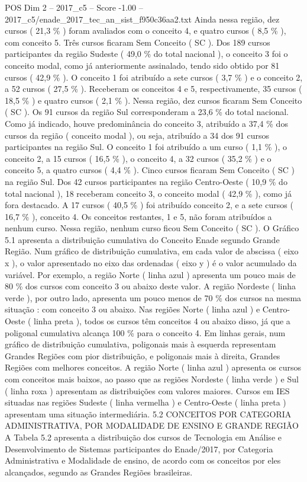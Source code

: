 \begin{textsample}{POS Dim 2 – 2017\_c5 – Score -1.00 – 2017\_c5/enade\_2017\_tec\_an\_sist\_f950c36aa2.txt}
Ainda nessa região, dez cursos ( 21,3 \% ) foram avaliados com o conceito 4, e quatro cursos ( 8,5 \% ), com conceito 5.
Três cursos ficaram Sem Conceito ( SC ).
Dos 189 cursos participantes da região Sudeste ( 49,0 \% do total nacional ), o conceito 3 foi o conceito modal, como já anteriormente assinalado, tendo sido obtido por 81 cursos ( 42,9 \% ).
O conceito 1 foi atribuído a sete cursos ( 3,7 \% ) e o conceito 2, a 52 cursos ( 27,5 \% ).
Receberam os conceitos 4 e 5, respectivamente, 35 cursos ( 18,5 \% ) e quatro cursos ( 2,1 \% ).
Nessa região, dez cursos ficaram Sem Conceito ( SC ).
Os 91 cursos da região Sul corresponderam a 23,6 \% do total nacional.
Como já indicado, houve predominância do conceito 3, atribuído a 37,4 \% dos cursos da região ( conceito modal ), ou seja, atribuído a 34 dos 91 cursos participantes na região Sul.
O conceito 1 foi atribuído a um curso ( 1,1 \% ), o conceito 2, a 15 cursos ( 16,5 \% ), o conceito 4, a 32 cursos ( 35,2 \% ) e o conceito 5, a quatro cursos ( 4,4 \% ).
Cinco cursos ficaram Sem Conceito ( SC ) na região Sul.
Dos 42 cursos participantes na região Centro-Oeste ( 10,9 \% do total nacional ), 18 receberam conceito 3, o conceito modal ( 42,9 \% ), como já fora destacado.
A 17 cursos ( 40,5 \% ) foi atribuído conceito 2, e a sete cursos ( 16,7 \% ), conceito 4.
Os conceitos restantes, 1 e 5, não foram atribuídos a nenhum curso.
Nessa região, nenhum curso ficou Sem Conceito ( SC ).
O Gráfico 5.1 apresenta a distribuição cumulativa do Conceito Enade segundo Grande Região.
Num gráfico de distribuição cumulativa, em cada valor de abscissa ( eixo x ), o valor apresentado no eixo das ordenadas ( eixo y ) é o valor acumulado da variável.
Por exemplo, a região Norte ( linha azul ) apresenta um pouco mais de 80 \% dos cursos com conceito 3 ou abaixo deste valor.
A região Nordeste ( linha verde ), por outro lado, apresenta um pouco menos de 70 \% dos cursos na mesma situação : com conceito 3 ou abaixo.
Nas regiões Norte ( linha azul ) e Centro-Oeste ( linha preta ), todos os cursos têm conceitos 4 ou abaixo disso, já que a poligonal cumulativa alcança 100 \% para o conceito 4.
Em linhas gerais, num gráfico de distribuição cumulativa, poligonais mais à esquerda representam Grandes Regiões com pior distribuição, e poligonais mais à direita, Grandes Regiões com melhores conceitos.
A região Norte ( linha azul ) apresenta os cursos com conceitos mais baixos, ao passo que as regiões Nordeste ( linha verde ) e Sul ( linha roxa ) apresentam as distribuições com valores maiores.
Cursos em IES situadas nas regiões Sudeste ( linha vermelha ) e Centro-Oeste ( linha preta ) apresentam uma situação intermediária. 5.2 CONCEITOS POR CATEGORIA ADMINISTRATIVA, POR MODALIDADE DE ENSINO E GRANDE REGIÃO A Tabela 5.2 apresenta a distribuição dos cursos de Tecnologia em Análise e Desenvolvimento de Sistemas participantes do Enade/2017, por Categoria Administrativa e Modalidade de ensino, de acordo com os conceitos por eles alcançados, segundo as Grandes Regiões brasileiras.

\end{textsample}
